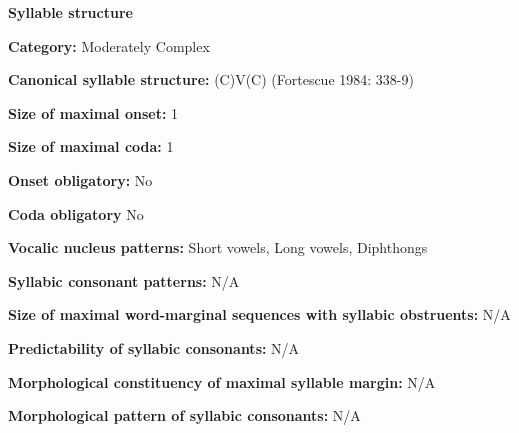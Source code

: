 \begin{styleBody}
\textbf{Syllable structure}
\end{styleBody}

\begin{styleBody}
\textbf{Category: }Moderately Complex
\end{styleBody}

\begin{styleBody}
\textbf{Canonical syllable structure: }(C)V(C) (Fortescue 1984: 338-9)
\end{styleBody}

\begin{styleBody}
\textbf{Size of maximal onset: }1
\end{styleBody}

\begin{styleBody}
\textbf{Size of maximal coda:} 1
\end{styleBody}

\begin{styleBody}
\textbf{Onset obligatory:} No
\end{styleBody}

\begin{styleBody}
\textbf{Coda obligatory }No
\end{styleBody}

\begin{styleBody}
\textbf{Vocalic nucleus patterns:} Short vowels, Long vowels, Diphthongs
\end{styleBody}

\begin{styleBody}
\textbf{Syllabic consonant patterns:} N/A
\end{styleBody}

\begin{styleBody}
\textbf{Size of maximal word{}-marginal sequences with syllabic obstruents:} N/A
\end{styleBody}

\begin{styleBody}
\textbf{Predictability of syllabic consonants:} N/A
\end{styleBody}

\begin{styleBody}
\textbf{Morphological constituency of maximal syllable margin:} N/A
\end{styleBody}

\begin{styleBody}
\textbf{Morphological pattern of syllabic consonants:} N/A
\end{styleBody}

